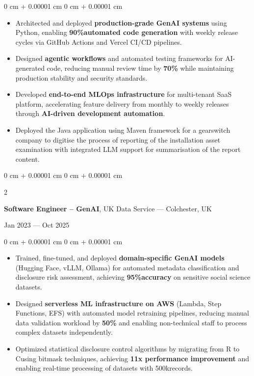 \documentclass[letterpaper]{article}
\newenvironment{highlights}{
    \begin{itemize}[
        topsep=0.03 cm,
        parsep=0.03 cm,
        partopsep=0pt,
        itemsep=0pt,
        leftmargin=0 cm + 10pt
    \]
}{
    \end{itemize}
} %
\newenvironment{onecolentry}{
    \begin{adjustwidth}{
        0 cm + 0.00001 cm
    }{
        0 cm + 0.00001 cm
    }
}{
    \end{adjustwidth}
} %
\newenvironment{twocolentry}[2][]{
    \onecolentry
    \def\secondColumn{#2}
    \setcolumnwidth{\fill, 4.5 cm}
    \begin{paracol}{2}
}{
    \switchcolumn \raggedleft \secondColumn
    \end{paracol}
    \endonecolentry
} %
\begin{document}
        \begin{onecolentry}
        \begin{highlights}
            \item Architected and deployed {\bfseries production-grade GenAI systems} using Python, enabling {\bfseries 90\%\textplus automated code generation} with weekly release cycles via GitHub Actions and Vercel CI/CD pipelines.
            \item Designed {\bfseries agentic workflows} and automated testing frameworks for AI-generated code, reducing manual review time by {\bfseries 70\%} while maintaining production stability and security standards.
            \item Developed {\bfseries end-to-end MLOps infrastructure} for multi-tenant SaaS platform, accelerating feature delivery from monthly to weekly releases through {\bfseries AI-driven development automation}.
            \item Deployed the Java application using Maven framework for a gearswitch company to digitise the process of reporting of the installation asset examination with integrated LLM support for summarisation of the report content.
        \end{highlights}
        \end{onecolentry}

        \begin{twocolentry}{Jan 2023 --- Oct 2025}
        \textbf{Software Engineer -- GenAI}, UK Data Service --- Colchester, UK
        \end{twocolentry}

        \begin{onecolentry}
        \begin{highlights}
            \item Trained, fine-tuned, and deployed {\bfseries domain-specific GenAI models} (Hugging Face, vLLM, Ollama) for automated metadata classification and disclosure risk assessment, achieving {\bfseries 95\%\textplus accuracy} on sensitive social science datasets.
            \item Designed {\bfseries serverless ML infrastructure on AWS} (Lambda, Step Functions, EFS) with automated model retraining pipelines, reducing manual data validation workload by {\bfseries 50\%} and enabling non-technical staff to process complex datasets independently.
            \item Optimized statistical disclosure control algorithms by migrating from R to C\textplus\textplus using bitmask techniques, achieving {\bfseries 11x performance improvement} and enabling real-time processing of datasets with 500k\textplus records.
        \end{highlights}
        \end{onecolentry}
\end{document}
